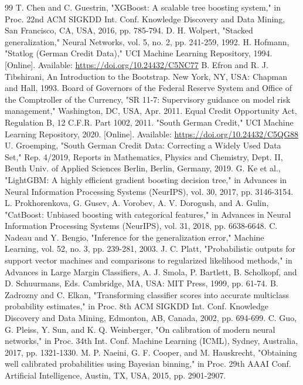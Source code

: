 \begin{thebibliography}{99}
 T. Chen and C. Guestrin, "XGBoost: A scalable tree boosting system," in Proc. 22nd ACM SIGKDD Int. Conf. Knowledge Discovery and Data Mining, San Francisco, CA, USA, 2016, pp. 785-794.
 D. H. Wolpert, "Stacked generalization," Neural Networks, vol. 5, no. 2, pp. 241-259, 1992.
 H. Hofmann, "Statlog (German Credit Data)," UCI Machine Learning Repository, 1994. [Online]. Available: \url{https://doi.org/10.24432/C5NC77}
 B. Efron and R. J. Tibshirani, An Introduction to the Bootstrap. New York, NY, USA: Chapman and Hall, 1993.
 Board of Governors of the Federal Reserve System and Office of the Comptroller of the Currency, "SR 11-7: Supervisory guidance on model risk management," Washington, DC, USA, Apr. 2011.
 Equal Credit Opportunity Act, Regulation B, 12 C.F.R. Part 1002, 2011.
 "South German Credit," UCI Machine Learning Repository, 2020. [Online]. Available: \url{https://doi.org/10.24432/C5QG88}
 U. Groemping, "South German Credit Data: Correcting a Widely Used Data Set," Rep. 4/2019, Reports in Mathematics, Physics and Chemistry, Dept. II, Beuth Univ. of Applied Sciences Berlin, Berlin, Germany, 2019.
 G. Ke et al., "LightGBM: A highly efficient gradient boosting decision tree," in Advances in Neural Information Processing Systems (NeurIPS), vol. 30, 2017, pp. 3146-3154.
 L. Prokhorenkova, G. Gusev, A. Vorobev, A. V. Dorogush, and A. Gulin, "CatBoost: Unbiased boosting with categorical features," in Advances in Neural Information Processing Systems (NeurIPS), vol. 31, 2018, pp. 6638-6648.
 C. Nadeau and Y. Bengio, "Inference for the generalization error," Machine Learning, vol. 52, no. 3, pp. 239-281, 2003.
 J. C. Platt, "Probabilistic outputs for support vector machines and comparisons to regularized likelihood methods," in Advances in Large Margin Classifiers, A. J. Smola, P. Bartlett, B. Scholkopf, and D. Schuurmans, Eds. Cambridge, MA, USA: MIT Press, 1999, pp. 61-74.
 B. Zadrozny and C. Elkan, "Transforming classifier scores into accurate multiclass probability estimates," in Proc. 8th ACM SIGKDD Int. Conf. Knowledge Discovery and Data Mining, Edmonton, AB, Canada, 2002, pp. 694-699.
 C. Guo, G. Pleiss, Y. Sun, and K. Q. Weinberger, "On calibration of modern neural networks," in Proc. 34th Int. Conf. Machine Learning (ICML), Sydney, Australia, 2017, pp. 1321-1330.
 M. P. Naeini, G. F. Cooper, and M. Hauskrecht, "Obtaining well calibrated probabilities using Bayesian binning," in Proc. 29th AAAI Conf. Artificial Intelligence, Austin, TX, USA, 2015, pp. 2901-2907.

\end{thebibliography}
